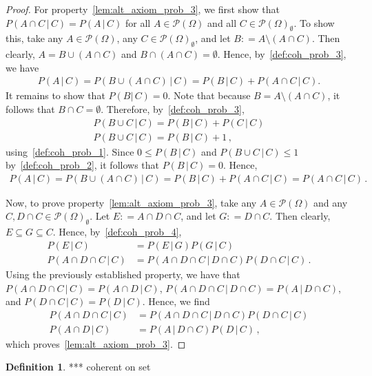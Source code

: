 \documentclass[10pt]{paper}
\theoremstyle{definition}
\newtheorem{definition}{Definition}
\newcommand{\paths}{\Omega}
\newcommand{\power}{\mathcal{P}(\paths)}
\newcommand{\nonemptypower}{\power_{\emptyset}}
\newcommand{\coloneqq}{:\!=}
\begin{document}
\begin{proof}
For property~\ref{lem:alt_axiom_prob_3}, we first show that $P(A\cap C\,\vert\,C) = P(A\,\vert\,C)$ for all $A\in\power$ and all $C\in\nonemptypower$. To show this, take any $A\in\power$, any $C\in\nonemptypower$, and let $B\coloneqq A\setminus(A\cap C)$. Then clearly, $A=B\cup(A\cap C)$ and $B\cap (A\cap C)=\emptyset$. Hence, by~\ref{def:coh_prob_3}, we have
\begin{align*}
P(A\,\vert\,C) = P(B\cup(A\cap C)\,\vert\,C)= P(B\,\vert\,C) + P(A\cap C\,\vert\,C).
\end{align*}
It remains to show that $P(B\vert\,C)=0$. Note that because $B=A\setminus(A\cap C)$, it follows that $B\cap C=\emptyset$. Therefore, by~\ref{def:coh_prob_3},
\begin{align*}
P(B\cup C\,\vert\,C)=P(B\,\vert\,C) + P(C\,\vert\,C) \\
P(B\cup C\,\vert\,C)=P(B\,\vert\,C) + 1\,,
\end{align*}
using~\ref{def:coh_prob_1}. Since $0\leq P(B\,\vert\,C)$ and $P(B\cup C\,\vert\,C)\leq 1$ by~\ref{def:coh_prob_2}, it follows that $P(B\,\vert\,C)=0$. Hence,
\begin{align*}
P(A\,\vert\,C) = P(B\cup(A\cap C)\,\vert\,C)= P(B\,\vert\,C) + P(A\cap C\,\vert\,C) = P(A\cap C\,\vert\,C)\,.
\end{align*}

Now, to prove property~\ref{lem:alt_axiom_prob_3}, take any $A\in\power$ and any $C,D\cap C\in\nonemptypower$. Let $E\coloneqq A\cap D\cap C$, and let $G\coloneqq D\cap C$. Then clearly, $E\subseteq G\subseteq C$. Hence, by~\ref{def:coh_prob_4},
\begin{align*}
P(E\,\vert\,C) &= P(E\,\vert\,G)P(G\,\vert\,C) \\
P(A\cap D\cap C\,\vert\,C) &= P(A\cap D\cap C\,\vert\,D\cap C)P(D\cap C\,\vert\,C)\,.
\end{align*}
Using the previously established property, we have that $P(A\cap D\cap C\,\vert\,C)=P(A\cap D\,\vert\,C)$, $P(A\cap D\cap C\,\vert\,D\cap C)=P(A\,\vert\,D\cap C)$, and $P(D\cap C\,\vert\,C)=P(D\,\vert\,C)$. Hence, we find
\begin{align*}
P(A\cap D\cap C\,\vert\,C) &= P(A\cap D\cap C\,\vert\,D\cap C)P(D\cap C\,\vert\,C) \\
P(A\cap D\,\vert\,C) &= P(A\,\vert\,D\cap C)P(D\,\vert\,C)\,,
\end{align*}
which proves~\ref{lem:alt_axiom_prob_3}.
\end{proof}

\begin{definition}
*** coherent on set
\end{definition}
\end{document}
